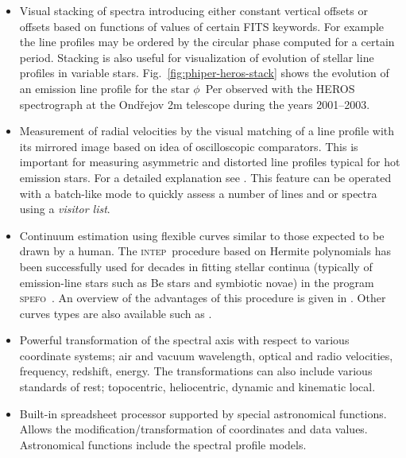 \documentclass[final,authoryear,5p,times,twocolumn]{elsarticle}
\newcommand{\spefo}{\textsc{spefo}}
\newcommand{\intep}{\textsc{intep}}
\begin{document}
\begin{itemize}

\item Visual stacking of spectra introducing either constant vertical offsets
  or offsets based on functions of values of certain FITS keywords. For example
  the line profiles may be ordered by the circular phase computed for a
  certain period. Stacking is also useful for visualization of evolution of
  stellar line profiles in variable stars.
  Fig.~\ref{fig:phiper-heros-stack} shows the evolution of an emission line
  profile for the star $\phi$~Per observed with the HEROS spectrograph
  \citep{2002PAICz..90....1S} at
  the Ond\v{r}ejov 2m telescope during the years 2001--2003.

\item Measurement of radial velocities by the visual matching of a line
  profile with its mirrored image based on idea of oscilloscopic comparators.
  This is important for measuring asymmetric and distorted line profiles
  typical for hot emission stars. For a detailed explanation see
  \citet{2007IAUS..240..486P}. This feature can be operated with a batch-like
  mode to quickly assess a number of lines and or spectra using a \emph{visitor list}.

\item Continuum estimation using flexible curves similar to those expected to
  be drawn by a human. The \intep\ procedure based on Hermite polynomials
  \citep{1982PDAO...16...67H} has been successfully used for decades in
  fitting stellar continua (typically of emission-line stars such as Be stars and
  symbiotic novae) in the program \spefo\ \citep{1996ASPC..101..187S}. An
  overview of the advantages of this procedure is given in
  \citet{2008asvo.proc...97S}. Other curves types are also available such as
  \citet{Akima:1970:NMI:321607.321609}.

\item Powerful transformation of the spectral axis with respect to various
  coordinate systems; air and vacuum wavelength, optical and radio velocities,
  frequency, redshift, energy. The transformations can also include various
  standards of rest; topocentric, heliocentric, dynamic and kinematic local.

\item Built-in spreadsheet processor supported by special astronomical
  functions. Allows the modification/transformation of coordinates and data
  values. Astronomical functions include the spectral profile models.


\end{itemize}
\end{document}
